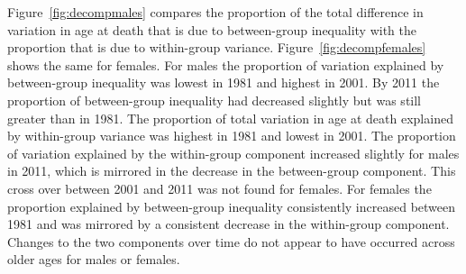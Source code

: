 \documentclass[12pt,oneside,a4paper]{article} %
\theoremstyle{definition}
\begin{document}
Figure~\ref{fig:decompmales} compares the proportion of the total difference in
variation in age at death that is due to between-group inequality with the proportion that is due to within-group variance. Figure~\ref{fig:decompfemales} shows the same for females. For males the proportion of variation explained by between-group inequality was lowest in 1981 and highest in 2001. By 2011 the proportion of between-group inequality had decreased slightly but was still greater than in 1981. The proportion of total variation in age at death explained by within-group variance was highest in 1981 and lowest in 2001. 
The proportion of variation explained by the within-group component increased slightly for males in 2011, which is mirrored in the decrease in the between-group component. This cross over between 2001 and 2011 was not found for females. For females the proportion explained by between-group inequality consistently increased between 1981 and was mirrored by a consistent decrease in the within-group component. Changes to the two components over time do not appear to have occurred across older ages for males or females. 
\end{document}
